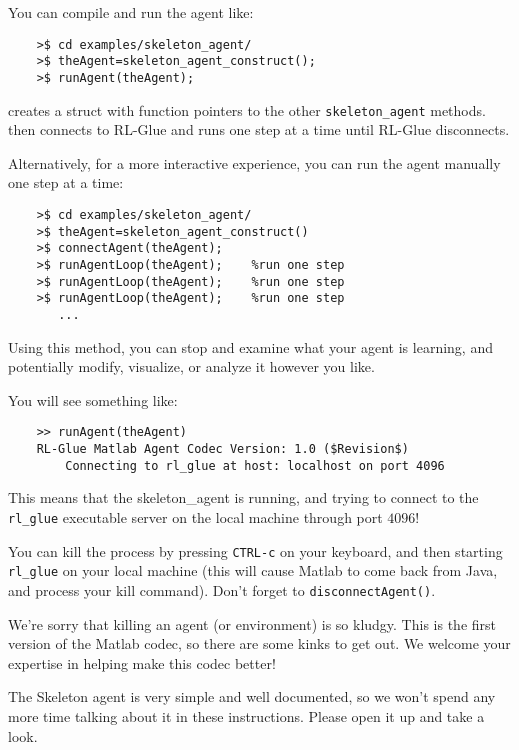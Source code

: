 \documentclass[11pt]{article}
\begin{document}
You can compile and run the agent like:
\begin{verbatim}
	>$ cd examples/skeleton_agent/
	>$ theAgent=skeleton_agent_construct();
	>$ runAgent(theAgent);
\end{verbatim}

 creates a struct with function pointers to the other \texttt{skeleton\_agent} methods.   then
connects to RL-Glue and runs one step at a time until RL-Glue disconnects.

Alternatively, for a more interactive experience, you can run the agent manually one step at a time:
\begin{verbatim}
	>$ cd examples/skeleton_agent/
	>$ theAgent=skeleton_agent_construct()
	>$ connectAgent(theAgent);
	>$ runAgentLoop(theAgent);    %run one step
	>$ runAgentLoop(theAgent);    %run one step
	>$ runAgentLoop(theAgent);    %run one step
	   ...
\end{verbatim}

Using this method, you can stop and examine what your agent is learning, and potentially modify, visualize, or analyze it however you like.

You will see something like:
\begin{verbatim}
	>> runAgent(theAgent)
	RL-Glue Matlab Agent Codec Version: 1.0 ($Revision$)
	    Connecting to rl_glue at host: localhost on port 4096
\end{verbatim}

This means that the skeleton\_agent is running, and trying to connect to the \texttt{rl\_glue} executable server on the local machine through port $4096$! 

You can kill the process by pressing \texttt{CTRL-c} on your keyboard, and then starting  \texttt{rl\_glue} on your local machine (this will cause Matlab to come back from Java, and 
process your kill command).  Don't forget to \texttt{disconnectAgent()}.

We're sorry that killing an agent (or environment) is so kludgy.  This is the first version of the Matlab codec, so there are some kinks to get out.  We welcome your expertise in helping 
make this codec better!

The Skeleton agent is very simple and well documented, so we won't spend any more time talking about it in these instructions.
Please open it up and take a look.
\end{document}
